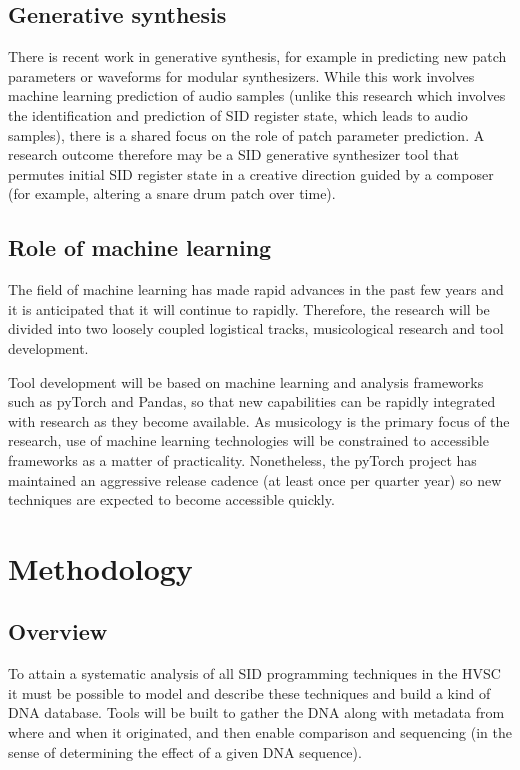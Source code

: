 \documentclass[10pt]{article}
\begin{document}
\begin{multicols*}{2}
  \subsection{Generative synthesis}
  There is recent work in generative synthesis, for example in
  predicting new patch parameters or waveforms for modular
  synthesizers.  While this work involves machine learning prediction
  of audio samples (unlike this research which involves the
  identification and prediction of SID register state, which leads to
  audio samples), there is a shared focus on the role of patch
  parameter prediction.  A research outcome therefore may be
  a SID generative synthesizer tool that permutes initial
  SID register state in a creative direction guided by a composer
  (for example, altering a snare drum patch over time).

  \subsection{Role of machine learning}
  The field of machine learning has made rapid advances in the past
  few years and it is anticipated that it will continue to
  rapidly. Therefore, the research will be divided into two loosely
  coupled logistical tracks, musicological research and tool
  development.

  Tool development will be based on machine learning and
  analysis frameworks such as pyTorch and Pandas, so that new
  capabilities can be rapidly integrated with research as they become
  available. As musicology is the primary focus of the research,
  use of machine learning technologies will be constrained to
  accessible frameworks as a matter of practicality. Nonetheless,
  the pyTorch project has maintained an aggressive release cadence
  (at least once per quarter year) so new techniques are expected
  to become accessible quickly.

  \section{Methodology}

  \subsection{Overview}
  To attain a systematic analysis of all SID programming techniques
  in the HVSC it must be possible to model and describe these
  techniques and build a kind of DNA database. Tools will be built
  to gather the DNA along with metadata from where and when it
  originated, and then enable comparison and sequencing (in
  the sense of determining the effect of a given DNA sequence).


\end{multicols*}
\end{document}
